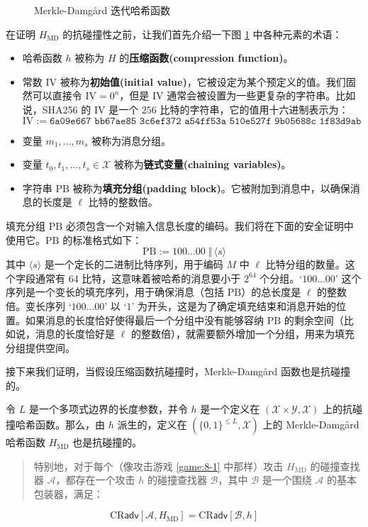 \begin{figure}
	\centering
	
	\caption{Merkle-Damg{\aa}rd 迭代哈希函数}
	\label{fig:8-5}
\end{figure}

在证明 $H_\mathrm{MD}$ 的抗碰撞性之前，让我们首先介绍一下图 \ref{fig:8-5} 中各种元素的术语：
\begin{itemize}
	\item 哈希函数 $h$ 被称为 $H$ 的\textbf{压缩函数(compression function)}。
	\item 常数 $\mathrm{IV}$ 被称为\textbf{初始值(initial value)}，它被设定为某个预定义的值。我们固然可以直接令 $\mathrm{IV}=0^n$，但是 $\mathrm{IV}$ 通常会被设置为一些更复杂的字符串。比如说，SHA256 的 $\mathrm{IV}$ 是一个 $256$ 比特的字符串，它的值用十六进制表示为：
	\[
	\mathrm{IV}:=\texttt{6a09e667 bb67ae85 3c6ef372 a54ff53a 510e527f 9b05688c 1f83d9ab 5be0cd19}
	\]
	\item 变量 $m_1,\dots,m_s$ 被称为消息分组。
	\item 变量 $t_0,t_1,\dots,t_s\in\mathcal{X}$ 被称为\textbf{链式变量(chaining variables)}。
	\item 字符串 $\mathrm{PB}$ 被称为\textbf{填充分组(padding block)}。它被附加到消息中，以确保消息的长度是 $\ell$ 比特的整数倍。
\end{itemize}

填充分组 $\mathrm{PB}$ 必须包含一个对输入信息长度的编码。我们将在下面的安全证明中使用它。$\mathrm{PB}$ 的标准格式如下：
\[
\mathrm{PB}:= \boxed{100\dots 00\;\Vert\,\langle s \rangle}
\]
其中 $\langle s \rangle$ 是一个定长的二进制比特序列，用于编码 $M$ 中 $\ell$ 比特分组的数量。这个字段通常有 $64$ 比特，这意味着被哈希的消息要小于 $2^{64}$ 个分组。`$100\dots 00$' 这个序列是一个变长的填充序列，用于确保消息（包括 $\mathrm{PB}$）的总长度是 $\ell$ 的整数倍。变长序列 `$100\dots 00$' 以 `$1$' 为开头，这是为了确定填充结束和消息开始的位置。如果消息的长度恰好使得最后一个分组中没有能够容纳 $\mathrm{PB}$ 的剩余空间（比如说，消息的长度恰好是 $\ell$ 的整数倍），就需要额外增加一个分组，用来为填充分组提供空间。

\begin{snote}
接下来我们证明，当假设压缩函数抗碰撞时，Merkle-Damg{\aa}rd 函数也是抗碰撞的。
\end{snote}

\begin{theorem}\label{theo:8-3}
令 $L$ 是一个多项式边界的长度参数，并令 $h$ 是一个定义在 $(\mathcal{X}\times\mathcal{Y},\mathcal{X})$ 上的抗碰撞哈希函数。那么，由 $h$ 派生的，定义在 $\left(\{0,1\}^{\leq L},\mathcal{X}\right)$ 上的 Merkle-Damg{\aa}rd 哈希函数 $H_\mathrm{MD}$ 也是抗碰撞的。
\begin{quote}
特别地，对于每个（像攻击游戏 \ref{game:8-1} 中那样）攻击 $H_\mathrm{MD}$ 的碰撞查找器 $\mathcal{A}$，都存在一个攻击 $h$ 的碰撞查找器 $\mathcal{B}$，其中 $\mathcal{B}$ 是一个围绕 $\mathcal{A}$ 的基本包装器，满足：
\end{quote}
\[
\mathrm{CR}\mathsf{adv}[\mathcal{A},H_\mathrm{MD}]=\mathrm{CR}\mathsf{adv}[\mathcal{B},h]
\]
\end{theorem}

